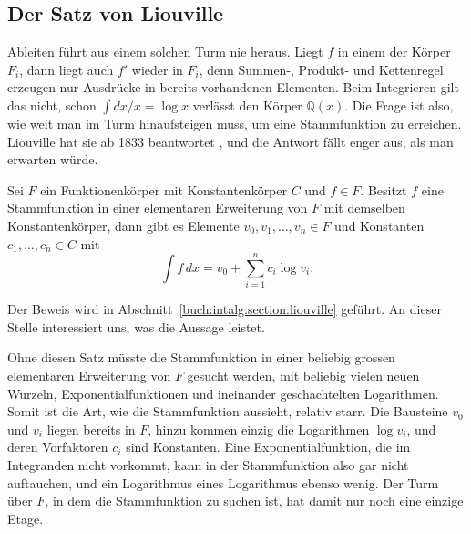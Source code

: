 \subsection{Der Satz von Liouville}
Ableiten führt aus einem solchen Turm nie heraus.
Liegt $f$ in einem der Körper $F_i$, dann liegt auch $f'$ wieder in
$F_i$, denn Summen-, Produkt- und Kettenregel erzeugen nur
Ausdrücke in bereits vorhandenen Elementen.
Beim Integrieren gilt das nicht, schon $\int dx/x = \log x$ verlässt
den Körper $\mathbb{Q}(x)$.
Die Frage ist also, wie weit man im Turm hinaufsteigen muss, um eine
Stammfunktion zu erreichen.
Liouville hat sie ab 1833 beantwortet
\cite{elliptisch:wiki-liouville}, und die
Antwort fällt enger aus, als man erwarten würde.
%
\begin{satz}
\label{elliptisch:satz:liouville}
Sei $F$ ein Funktionenkörper mit Konstantenkörper $C$ und $f \in F$.
Besitzt $f$ eine Stammfunktion in einer elementaren Erweiterung von
$F$ mit demselben Konstantenkörper, dann gibt es Elemente
$v_0, v_1, \dots, v_n \in F$ und Konstanten
$c_1, \dots, c_n \in C$ mit
\begin{equation}
\int f\,dx
=
v_0 + \sum_{i=1}^n c_i \log v_i.
\label{elliptisch:equation:liouville}
\end{equation}
\end{satz}
Der Beweis wird in Abschnitt~\ref{buch:intalg:section:liouville}
geführt.
An dieser Stelle interessiert uns, was die Aussage leistet.

Ohne diesen Satz müsste die Stammfunktion in einer beliebig grossen
elementaren Erweiterung von $F$ gesucht werden, mit beliebig vielen
neuen Wurzeln, Exponentialfunktionen und ineinander geschachtelten
Logarithmen.
Somit ist die Art, wie die Stammfunktion aussieht, relativ starr.
Die Bausteine $v_0$ und $v_i$ liegen bereits in $F$, hinzu kommen
einzig die Logarithmen $\log v_i$, und deren Vorfaktoren $c_i$ sind
Konstanten.
Eine Exponentialfunktion, die im Integranden nicht vorkommt, kann in
der Stammfunktion also gar nicht auftauchen, und ein Logarithmus
eines Logarithmus ebenso wenig.
Der Turm über $F$, in dem die Stammfunktion zu suchen ist, hat damit
nur noch eine einzige Etage.

